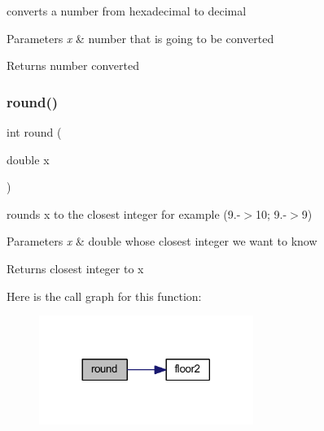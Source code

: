 converts a number from hexadecimal to decimal 


\begin{DoxyParams}{Parameters}
{\em x} & number that is going to be converted \\
\hline
\end{DoxyParams}
\begin{DoxyReturn}{Returns}
number converted 
\end{DoxyReturn}
\hypertarget{group__utilities_ga35abf8e6bc22bc3736fbd65416d8c3a2}{}\label{group__utilities_ga35abf8e6bc22bc3736fbd65416d8c3a2} 
\subsubsection{\texorpdfstring{round()}{round()}}
{\footnotesize\ttfamily int round (\begin{DoxyParamCaption}\item[{double}]{x }\end{DoxyParamCaption})}



rounds x to the closest integer for example (9.-\/$>$10; 9.-\/$>$9) 


\begin{DoxyParams}{Parameters}
{\em x} & double whose closest integer we want to know \\
\hline
\end{DoxyParams}
\begin{DoxyReturn}{Returns}
closest integer to x 
\end{DoxyReturn}
Here is the call graph for this function\+:\nopagebreak
\begin{figure}[H]
\begin{center}
\leavevmode
\includegraphics[width=197pt]{group__utilities_ga35abf8e6bc22bc3736fbd65416d8c3a2_cgraph}
\end{center}
\end{figure}
\hypertarget{group__utilities_ga92a937ad6b303c03cc98f5fe9354d235}{}\label{group__utilities_ga92a937ad6b303c03cc98f5fe9354d235} 
